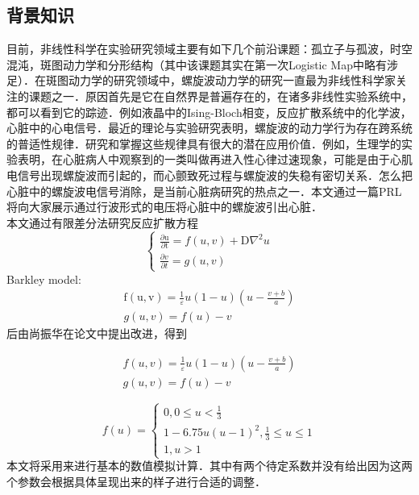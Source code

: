 

\subsection{背景知识}
目前，非线性科学在实验研究领域主要有如下几个前沿课题：孤立子与孤波，时空混沌，斑图动力学和分形结构（其中该课题其实在第一次Logistic Map中略有涉足）．在斑图动力学的研究领域中，螺旋波动力学的研究一直最为非线性科学家关注的课题之一．原因首先是它在自然界是普遍存在的，在诸多非线性实验系统中，都可以看到它的踪迹．例如液晶中的Ising-Bloch相变，反应扩散系统中的化学波，心脏中的心电信号．最近的理论与实验研究表明，螺旋波的动力学行为存在跨系统的普适性规律．研究和掌握这些规律具有很大的潜在应用价值．例如，生理学的实验表明，在心脏病人中观察到的一类叫做再进入性心律过速现象，可能是由于心肌电信号出现螺旋波而引起的，而心颤致死过程与螺旋波的失稳有密切关系．怎么把心脏中的螺旋波电信号消除，是当前心脏病研究的热点之一．本文通过一篇PRL\cite{zhang2005suppress}将向大家展示通过行波形式的电压将心脏中的螺旋波引出心脏．\\
本文通过有限差分法研究反应扩散方程
\begin{equation}
\left\{\begin{array}{c}
\frac{\partial \mathrm{u}}{\partial \mathrm{t}}=f(u, v)+\mathrm{D} \nabla^{2} u \\
\frac{\partial v}{\partial t}=g(u, v)
\end{array}\right.
\end{equation}
Barkley model:
\begin{equation}
\begin{array}{c}
\mathrm{f}(\mathrm{u}, \mathrm{v})=\frac{1}{\varepsilon} u(1-u)\left(u-\frac{v+b}{a}\right) \\
g(u, v)=f(u)-v
\end{array}
\end{equation}
后由尚振华在论文中提出改进，得到

\begin{equation}

\begin{array}{c}
	f(u, v)=\frac{1}{\varepsilon} u(1-u)\left(u-\frac{v+b}{a}\right)\\
	g(u, v)=f(u)-v
\end{array}
\end{equation}

\begin{equation}

f(u)=\left\{\begin{array}{c}
0,0 \leq u<\frac{1}{3} \\
1-6.75 u(u-1)^{2}, \frac{1}{3} \leq u \leq 1 \\
1, u>1
\end{array}\right.
\end{equation}
本文将采用来进行基本的数值模拟计算．其中有两个待定系数并没有给出因为这两个参数会根据具体呈现出来的样子进行合适的调整．
